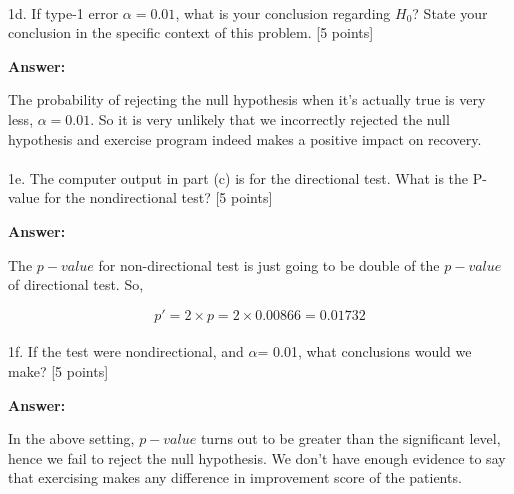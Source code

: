 \documentclass[
  letterpaper,
  DIV=11,
  numbers=noendperiod]{scrartcl}
\makeatletter
\let\oldparagraph\paragraph
\renewcommand{\paragraph}{
    \@ifstar
      \xxxParagraphStar
      \xxxParagraphNoStar
  }
\newcommand{\xxxParagraphStar}[1]{\oldparagraph*{#1}\mbox{}}
\newcommand{\xxxParagraphNoStar}[1]{\oldparagraph{#1}\mbox{}}
\makeatother
\begin{document}
\paragraph{\texorpdfstring{1d. If type-1 error \(\alpha = 0.01\), what
is your conclusion regarding \(H_0\)? State your conclusion in the
specific context of this problem. {[}5
points{]}}{1d. If type-1 error \textbackslash alpha = 0.01, what is your conclusion regarding H\_0? State your conclusion in the specific context of this problem. {[}5 points{]}}}\label{d.-if-type-1-error-alpha-0.01-what-is-your-conclusion-regarding-h_0-state-your-conclusion-in-the-specific-context-of-this-problem.-5-points}

\textbf{Answer:}

The probability of rejecting the null hypothesis when it's actually true
is very less, \(\alpha = 0.01\). So it is very unlikely that we
incorrectly rejected the null hypothesis and exercise program indeed
makes a positive impact on recovery.

\paragraph{1e. The computer output in part (c) is for the directional
test. What is the P-value for the nondirectional test? {[}5
points{]}}\label{e.-the-computer-output-in-part-c-is-for-the-directional-test.-what-is-the-p-value-for-the-nondirectional-test-5-points}

\textbf{Answer:}

The \(p-value\) for non-directional test is just going to be double of
the \(p-value\) of directional test. So,

\[
p' = 2 \times p = 2 \times 0.00866 = 0.01732
\]

\paragraph{\texorpdfstring{1f. If the test were nondirectional, and
\(\alpha\)= 0.01, what conclusions would we make? {[}5
points{]}}{1f. If the test were nondirectional, and \textbackslash alpha= 0.01, what conclusions would we make? {[}5 points{]}}}\label{f.-if-the-test-were-nondirectional-and-alpha-0.01-what-conclusions-would-we-make-5-points}

\textbf{Answer:}

In the above setting, \(p-value\) turns out to be greater than the
significant level, hence we fail to reject the null hypothesis. We don't
have enough evidence to say that exercising makes any difference in
improvement score of the patients.
\end{document}
